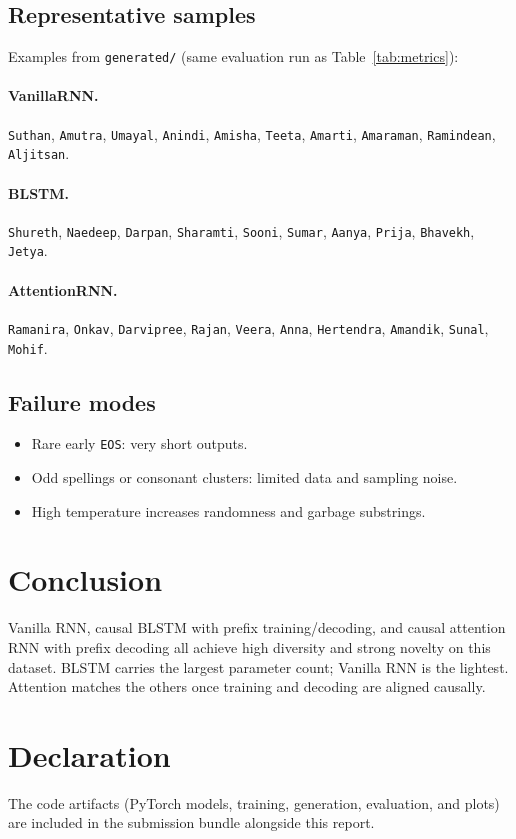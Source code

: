 \documentclass[11pt,a4paper]{article}
\begin{document}
\subsection{Representative samples}
Examples from \texttt{generated/} (same evaluation run as Table~\ref{tab:metrics}):

\paragraph{VanillaRNN.}
\texttt{Suthan}, \texttt{Amutra}, \texttt{Umayal}, \texttt{Anindi}, \texttt{Amisha},
\texttt{Teeta}, \texttt{Amarti}, \texttt{Amaraman}, \texttt{Ramindean}, \texttt{Aljitsan}.

\paragraph{BLSTM.}
\texttt{Shureth}, \texttt{Naedeep}, \texttt{Darpan}, \texttt{Sharamti}, \texttt{Sooni},
\texttt{Sumar}, \texttt{Aanya}, \texttt{Prija}, \texttt{Bhavekh}, \texttt{Jetya}.

\paragraph{AttentionRNN.}
\texttt{Ramanira}, \texttt{Onkav}, \texttt{Darvipree}, \texttt{Rajan}, \texttt{Veera},
\texttt{Anna}, \texttt{Hertendra}, \texttt{Amandik}, \texttt{Sunal}, \texttt{Mohif}.

\subsection{Failure modes}
\begin{itemize}[nosep]
  \item Rare early \texttt{EOS}: very short outputs.
  \item Odd spellings or consonant clusters: limited data and sampling noise.
  \item High temperature increases randomness and garbage substrings.
\end{itemize}

\section{Conclusion}
Vanilla RNN, causal BLSTM with prefix training/decoding, and causal attention RNN
with prefix decoding all achieve high diversity and strong novelty on this dataset.
BLSTM carries the largest parameter count; Vanilla RNN is the lightest. Attention
matches the others once training and decoding are aligned causally.

\section*{Declaration}
The code artifacts (PyTorch models, training, generation, evaluation, and plots) are
included in the submission bundle alongside this report.
\end{document}
